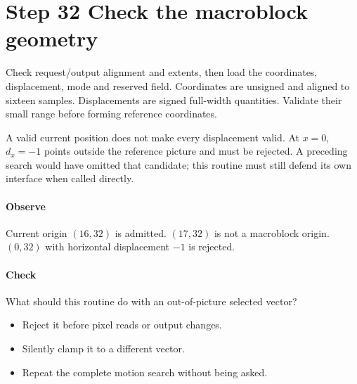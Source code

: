 \section{Step 32 Check the macroblock geometry}\label{h263-macroblock-s02}
Check request/output alignment and extents, then load the coordinates,
displacement, mode and reserved field. Coordinates are unsigned and aligned to
sixteen samples. Displacements are signed full-width quantities. Validate their
small range before forming reference coordinates.

A valid current position does not make every displacement valid. At $x=0$,
$d_x=-1$ points outside the reference picture and must be rejected. A preceding
search would have omitted that candidate; this routine must still defend its
own interface when called directly.

\paragraph{Observe} Current origin $(16,32)$ is admitted. $(17,32)$ is not a
macroblock origin. $(0,32)$ with horizontal displacement $-1$ is rejected.
\paragraph{Check} What should this routine do with an out-of-picture selected vector?
\begin{itemize}
  \item[A.] Reject it before pixel reads or output changes.
  \item[B.] Silently clamp it to a different vector.
  \item[C.] Repeat the complete motion search without being asked.
\end{itemize}
